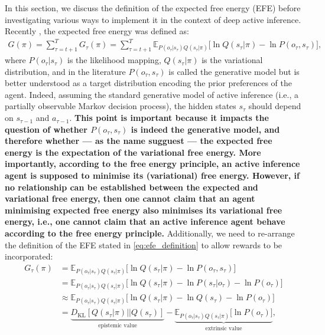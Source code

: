 \documentclass[twoside,11pt]{article}
\newcommand{\kl}[2]{D_{\mathrm{KL}} \left[ \left. \left. #1 \right|\right| #2 \right] }
\begin{document}
In this section, we discuss the definition of the expected free energy (EFE) before investigating various ways to implement it in the context of deep active inference. Recently \citep{Parr304782}, the expected free energy was defined as:
\begin{align}
G(\pi) = \sum_{\tau = t+1}^T G_\tau(\pi) = \sum_{\tau = t+1}^T \mathbb{E}_{P(o_\tau|s_\tau)Q(s_\tau | \pi)}\big[\ln Q(s_\tau | \pi) - \ln P(o_\tau, s_\tau)\big],\label{eq:efe_definition}
\end{align}
where $P(o_\tau|s_\tau)$ is the likelihood mapping, $Q(s_\tau | \pi)$ is the variational distribution, and in the literature $P(o_\tau, s_\tau)$ is called the generative model but is better understood as a target distribution encoding the prior preferences of the agent. Indeed, assuming the standard generative model of active inference (i.e., a partially observable Markov decision process), the hidden states $s_\tau$ should depend on $s_{\tau-1}$ and $a_{\tau-1}$. \textbf{This point is important because it impacts the question of whether $P(o_\tau, s_\tau)$ is indeed the generative model, and therefore whether --- as the name sugguest --- the expected free energy is the expectation of the variational free energy. More importantly, according to the free energy principle, an active inference agent is supposed to minimise its (variational) free energy. However, if no relationship can be established between the expected and variational free energy, then one cannot claim that an agent minimising expected free energy also minimises its variational free energy, i.e., one cannot claim that an active inference agent behave according to the free energy principle.} Additionally, we need to re-arrange the definition of the EFE stated in \eqref{eq:efe_definition} to allow rewards to be incorporated:
\begin{align}
G_\tau(\pi) &= \mathbb{E}_{P(o_\tau|s_\tau)Q(s_\tau | \pi)}\big[\ln Q(s_\tau | \pi) - \ln P(o_\tau, s_\tau)\big]\nonumber\\
&= \mathbb{E}_{P(o_\tau|s_\tau)Q(s_\tau | \pi)}\big[\ln Q(s_\tau | \pi) - \ln P(s_\tau|o_\tau)- \ln P(o_\tau)\big]\nonumber\\
&\approx \mathbb{E}_{P(o_\tau|s_\tau)Q(s_\tau | \pi)}\big[\ln Q(s_\tau | \pi) - \ln Q(s_\tau)- \ln P(o_\tau)\big]\nonumber\\
&= \underbrace{\kl{Q(s_\tau | \pi)}{Q(s_\tau)}}_{\text{epistemic value}} - \underbrace{\mathbb{E}_{P(o_\tau|s_\tau)Q(s_\tau | \pi)}\big[\ln P(o_\tau)\big]}_{\text{extrinsic value}},\label{eq:efe_practice}
\end{align}
\end{document}
